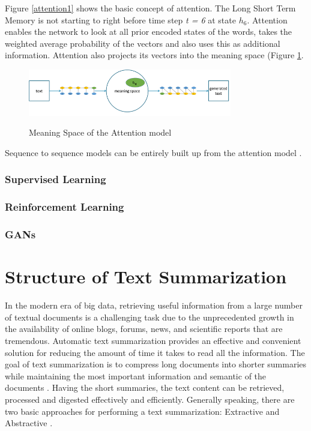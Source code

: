Figure \ref{attention1} shows the basic concept of attention. The Long Short Term Memory is not starting to right before time step \textit{t = 6} at state \textit{\(h_{6}\)}. Attention enables the network to look at all prior encoded states of the words, takes the weighted average probability of the vectors and also uses this as additional information. Attention also projects its vectors into the meaning space (Figure \ref{meaningspace}. 

\begin{figure}
	\begin{center}
		\includegraphics[width=3.5in]{photos/w1-21}\\
		\caption{Meaning Space of the Attention model \cite{mugan}}\label{meaningspace}
	\end{center}
\end{figure}

Sequence to sequence models can be entirely built up from the attention model \cite{attention2}. 




\subsubsection{Supervised Learning}
\subsubsection{Reinforcement Learning}
\subsubsection{GANs}

\section{Structure of Text Summarization}

In the modern era of big data, retrieving useful information from a large number of textual documents is a challenging task due to the unprecedented growth in the availability of online blogs, forums, news, and scientific reports that are tremendous. Automatic text summarization provides an effective and convenient solution for reducing the amount of time it takes to read all the information. The goal of text summarization is to compress long documents into shorter summaries while maintaining the most important information and semantic of the documents \cite{ts-intro} \cite{ts-intro2}. Having the short summaries, the text content can be retrieved, processed and digested effectively and efficiently. 
Generally speaking, there are two basic approaches for performing a text summarization: Extractive and Abstractive \cite{ts-intro3}. 

